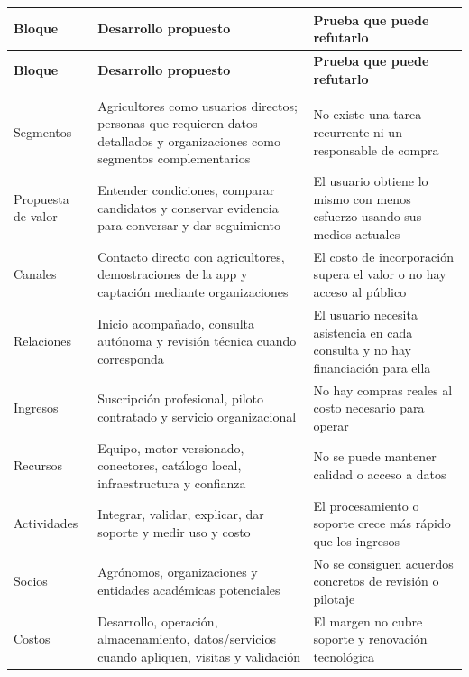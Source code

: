 \documentclass[10pt,a4paper]{article}
\begin{document}
\begingroup\small
\begin{longtable}{>{\raggedright\arraybackslash}p{3.647cm}>{\raggedright\arraybackslash}p{5.867cm}>{\raggedright\arraybackslash}p{6.343cm}}
\toprule
\textbf{Bloque} & \textbf{Desarrollo propuesto} & \textbf{Prueba que puede refutarlo} \\
\midrule\endfirsthead
\toprule
\textbf{Bloque} & \textbf{Desarrollo propuesto} & \textbf{Prueba que puede refutarlo} \\
\midrule\endhead
\midrule\multicolumn{3}{r}{\scriptsize Continúa en la página siguiente}\\\endfoot
\bottomrule\endlastfoot
Segmentos & Agricultores como usuarios directos; personas que requieren datos detallados y organizaciones como segmentos complementarios & No existe una tarea recurrente ni un responsable de compra \\[3pt]
Propuesta de valor & Entender condiciones, comparar candidatos y conservar evidencia para conversar y dar seguimiento & El usuario obtiene lo mismo con menos esfuerzo usando sus medios actuales \\[3pt]
Canales & Contacto directo con agricultores, demostraciones de la app y captación mediante organizaciones & El costo de incorporación supera el valor o no hay acceso al público \\[3pt]
Relaciones & Inicio acompañado, consulta autónoma y revisión técnica cuando corresponda & El usuario necesita asistencia en cada consulta y no hay financiación para ella \\[3pt]
Ingresos & Suscripción profesional, piloto contratado y servicio organizacional & No hay compras reales al costo necesario para operar \\[3pt]
Recursos & Equipo, motor versionado, conectores, catálogo local, infraestructura y confianza & No se puede mantener calidad o acceso a datos \\[3pt]
Actividades & Integrar, validar, explicar, dar soporte y medir uso y costo & El procesamiento o soporte crece más rápido que los ingresos \\[3pt]
Socios & Agrónomos, organizaciones y entidades académicas potenciales & No se consiguen acuerdos concretos de revisión o pilotaje \\[3pt]
Costos & Desarrollo, operación, almacenamiento, datos/\allowbreak{}servicios cuando apliquen, visitas y validación & El margen no cubre soporte y renovación tecnológica \\[3pt]
\end{longtable}
\endgroup
\end{document}
